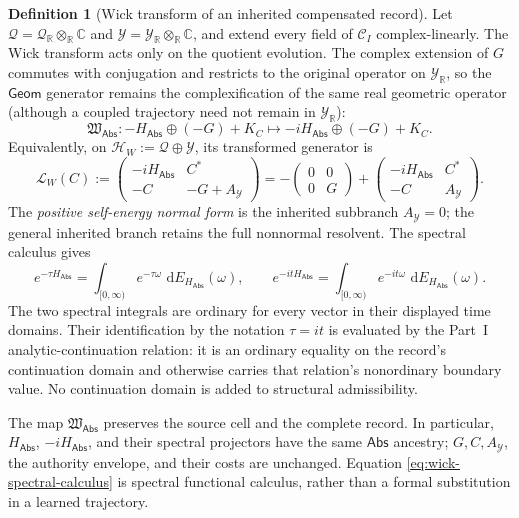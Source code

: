 \documentclass[11pt]{article}
\numberwithin{section}{part}
\theoremstyle{plain}
\theoremstyle{definition}
\newtheorem{definition}[definition]{Definition}
\theoremstyle{remark}
\newcommand{\dd}{\,\mathrm d}
\newcommand{\Geom}{\mathsf{Geom}}
\newcommand{\Abs}{\mathsf{Abs}}
\begin{document}
\begin{definition}[Wick transform of an inherited compensated record]
Let \(\mathcal Q=\mathcal Q_{\mathbb R}\otimes_{\mathbb R}\mathbb C\) and
\(\mathcal Y=\mathcal Y_{\mathbb R}\otimes_{\mathbb R}\mathbb C\), and
extend every field of \(\mathscr C_I\) complex-linearly.  The Wick transform
acts only on the quotient evolution.  The complex extension of \(G\)
commutes with conjugation and restricts to the original operator on
\(\mathcal Y_{\mathbb R}\), so the \(\Geom\) generator remains the
complexification of the same real geometric operator (although a coupled
trajectory need not remain in \(\mathcal Y_{\mathbb R}\)):
\begin{equation}
 \label{eq:wick-record-map}
 \mathfrak W_{\Abs}:
 -H_{\Abs}\oplus(-G)+K_C
 \longmapsto
 -iH_{\Abs}\oplus(-G)+K_C.
\end{equation}
Equivalently, on \(\mathcal H_W:=\mathcal Q\oplus\mathcal Y\), its
transformed generator is
\begin{equation}
 \label{eq:wick-block-generator}
 \mathcal L_W(C)
 :=\begin{pmatrix}
      -iH_{\Abs}&C^*\\
      -C&-G+A_{\mathcal Y}
    \end{pmatrix}
 =-\begin{pmatrix}0&0\\0&G\end{pmatrix}
  +\begin{pmatrix}-iH_{\Abs}&C^*\\-C&A_{\mathcal Y}\end{pmatrix}.
\end{equation}
The \emph{positive self-energy normal form} is the inherited subbranch
\(A_{\mathcal Y}=0\); the general inherited branch retains the full
nonnormal resolvent.  The spectral calculus gives
\begin{equation}
 \label{eq:wick-spectral-calculus}
 e^{-\tau H_{\Abs}}
 =\int_{[0,\infty)}e^{-\tau\omega}\,\dd E_{H_{\Abs}}(\omega),
 \qquad
 e^{-itH_{\Abs}}
 =\int_{[0,\infty)}e^{-it\omega}\,\dd E_{H_{\Abs}}(\omega).
\end{equation}
The two spectral integrals are ordinary for every vector in their displayed
time domains.  Their identification by the notation \(\tau=it\) is evaluated
by the Part~I analytic-continuation relation: it is an ordinary equality on
the record's continuation domain and otherwise carries that relation's
nonordinary boundary value.  No continuation domain is added to structural
admissibility.
\end{definition}

The map \(\mathfrak W_{\Abs}\) preserves the source cell and the complete
record.  In particular, \(H_{\Abs}\), \(-iH_{\Abs}\), and their spectral
projectors have the same \(\Abs\) ancestry; \(G,C,A_{\mathcal Y}\), the
authority envelope, and their costs are unchanged.  Equation
\eqref{eq:wick-spectral-calculus} is spectral functional calculus, rather
than a formal substitution in a learned trajectory.
\end{document}
